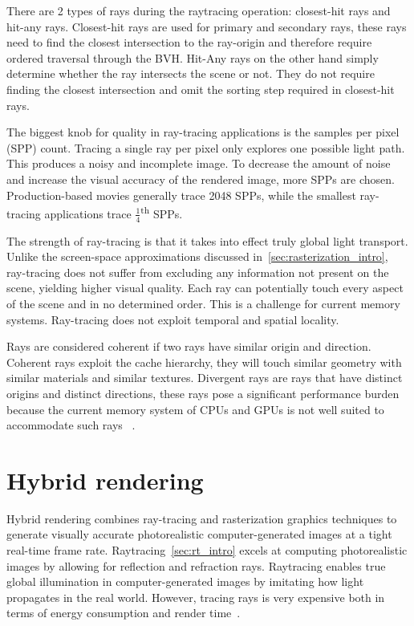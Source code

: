 There are 2 types of rays during the raytracing operation: closest-hit rays and hit-any rays. Closest-hit rays are used for primary and secondary rays, these rays need to find the closest intersection to the ray-origin and therefore require ordered traversal through the BVH. Hit-Any rays on the other hand simply determine whether the ray intersects the scene or not. They do not require finding the closest intersection and omit the sorting step required in closest-hit rays. 

The biggest knob for quality in ray-tracing applications is the samples per pixel (SPP) count. Tracing a single ray per pixel only explores one possible light path. This produces a noisy and incomplete image. To decrease the amount of noise and increase the visual accuracy of the rendered image, more SPPs are chosen. Production-based movies generally trace 2048 SPPs, while the smallest ray-tracing applications trace \(\frac{1}{4}\)\textsuperscript{th} SPPs.

The strength of ray-tracing is that it takes into effect truly global light transport. Unlike the screen-space approximations discussed in~\autoref{sec:rasterization_intro}, ray-tracing does not suffer from excluding any information not present on the scene, yielding higher visual quality. Each ray can potentially touch every aspect of the scene and in no determined order. This is a challenge for current memory systems. Ray-tracing does not exploit temporal and spatial locality.

Rays are considered coherent if two rays have similar origin and direction. Coherent rays exploit the cache hierarchy, they will touch similar geometry with similar materials and similar textures. Divergent rays are rays that have distinct origins and distinct directions, these rays pose a significant performance burden because the current memory system of CPUs and GPUs is not well suited to accommodate such rays ~\cite{demoullin2019hashbased}.

\section{Hybrid rendering}
\label{sec:hybrid_intro}

Hybrid rendering combines ray-tracing and rasterization graphics techniques to generate visually accurate photorealistic computer-generated images at a tight real-time frame rate.  Raytracing~\autoref{sec:rt_intro} excels at computing photorealistic images by allowing for reflection and refraction rays. Raytracing enables true global illumination in computer-generated images by imitating how light propagates in the real world. However, tracing rays is very expensive both in terms of energy consumption and render time~\cite{10.1111/cgf.12458}. 

